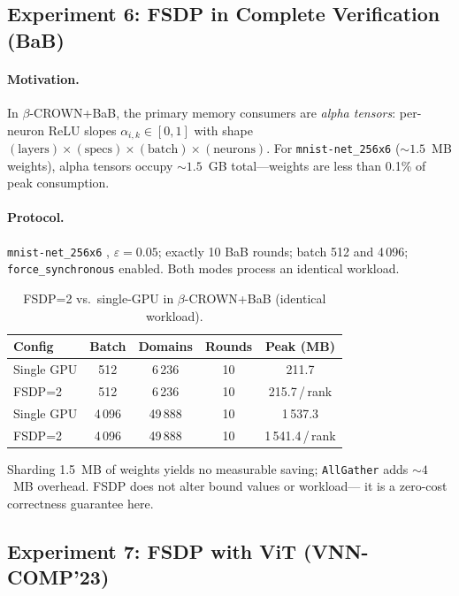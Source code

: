 \documentclass[11pt]{article}
\begin{document}
\subsection{Experiment 6: FSDP in Complete Verification (BaB)}
\label{sec:exp6}

\paragraph{Motivation.}
In $\beta$-CROWN+BaB, the primary memory consumers are \emph{alpha tensors}:
per-neuron ReLU slopes $\alpha_{i,k} \in [0,1]$ with shape
$(\text{layers}) \times (\text{specs}) \times (\text{batch}) \times (\text{neurons})$.
For \texttt{mnist-net\_256x6} (${\sim}1.5$~MB weights), alpha tensors occupy
${\sim}1.5$~GB total---weights are less than 0.1\% of peak consumption.

\paragraph{Protocol.}
\texttt{mnist-net\_256x6} \citep{arXiv2212VNNCOMP2022}, $\varepsilon{=}0.05$;
exactly 10 BaB rounds; batch 512 and 4\,096; \texttt{force\_synchronous}
enabled. Both modes process an identical workload.

\begin{table}[h]
\caption{FSDP=2 vs.\ single-GPU in $\beta$-CROWN+BaB (identical workload).}
\label{tab:fsdp-bab}
\vskip 0.1in
\begin{center}
\begin{tabular}{lcccc}
\toprule
Config & Batch & Domains & Rounds & Peak (MB) \\
\midrule
Single GPU & 512    & 6\,236  & 10 & 211.7 \\
FSDP=2     & 512    & 6\,236  & 10 & 215.7\,/\,rank \\
Single GPU & 4\,096 & 49\,888 & 10 & 1\,537.3 \\
FSDP=2     & 4\,096 & 49\,888 & 10 & 1\,541.4\,/\,rank \\
\bottomrule
\end{tabular}
\end{center}
\end{table}

Sharding 1.5~MB of weights yields no measurable saving; \texttt{AllGather}
adds ${\sim}4$~MB overhead. FSDP does not alter bound values or workload---
it is a zero-cost correctness guarantee here.

\subsection{Experiment 7: FSDP with ViT (VNN-COMP'23)}
\label{sec:exp7}
\end{document}
